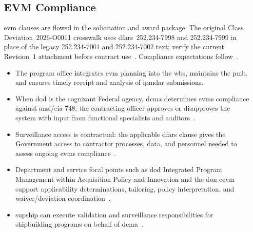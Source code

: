 \documentclass[../main.tex]{subfiles}
\begin{document}
\subsection{EVM Compliance}
\ac{evm} clauses are flowed in the solicitation and award package. The original Class Deviation~2026-O0011 crosswalk uses \ac{dfars}~252.234-7998 and 252.234-7999 in place of the legacy 252.234-7001 and 252.234-7002 text; verify the current Revision~1 attachment before contract use~\autocite{DFARS-EVMS-Deviation-2026-Baseline,DFARS-EVMS-Deviation-2026}. Compliance expectations follow~\autocite{edo-3-6-1-evm-intro-2025,DoDI5000-85,DFARS-EVMS-Deviation-2026,DoD-IPM-EVM-Definitions-2026,DCMA-EVMS-Group-2026}.
\begin{itemize}
  \item The program office integrates \ac{evm} planning into the \ac{wbs}, maintains the \ac{pmb}, and ensures timely receipt and analysis of \ac{ipmdar} submissions.
  \item When \ac{dod} is the cognizant Federal agency, \ac{dcma} determines \ac{evms} compliance against \ac{ansi}/\ac{eia}-748; the contracting officer approves or disapproves the system with input from functional specialists and auditors~\autocite{DFARS-EVMS-Deviation-2026,DoD-IPM-EVM-Definitions-2026,DCMA-EVMS-Group-2026}.
  \item Surveillance access is contractual: the applicable \ac{dfars} clause gives the Government access to contractor processes, data, and personnel needed to assess ongoing \ac{evms} compliance~\autocite{DFARS-EVMS-Deviation-2026,DCMA-EVMS-Group-2026}.
  \item Department and service focal points such as \ac{dod} Integrated Program Management within Acquisition Policy
        and Innovation and the \ac{don} \ac{cevm} support applicability determinations, tailoring,
        policy interpretation, and waiver/deviation coordination~\autocite{DoD-IPM-Policy-Guidance-2026,DON-CEVM-2026}.
  \item \ac{supship} can execute validation and surveillance responsibilities for shipbuilding programs on behalf of \ac{dcma}~\autocite{DoD-IPM-EVM-Definitions-2026}.
\end{itemize}
\end{document}

